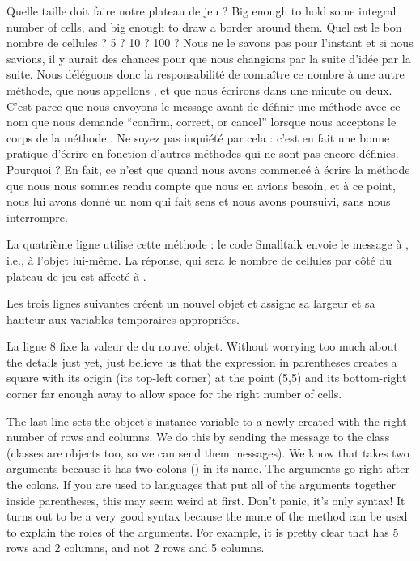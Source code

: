 \documentclass[a4paper,10pt,twoside]{book}
\begin{document}
Quelle taille doit faire notre plateau de jeu ? Big enough to hold some integral number of cells, and big enough to draw a border around them.
Quel est le bon nombre de cellules ? 5 ? 10 ? 100 ? Nous ne le savons pas pour l'instant et si nous savions, il y aurait des chances pour que nous changions par la suite d'idée par la suite. Nous déléguons donc la responsabilité de connaître ce nombre à une autre méthode, que nous appellons , et que nous écrirons dans une minute ou deux.
C'est parce que nous envoyons le message  avant de définir une méthode avec ce nom que \squeak nous demande ``confirm, correct, or cancel'' lorsque nous acceptons le corps de la méthode .
Ne soyez pas inquiété par cela : c'est en fait une bonne pratique d'écrire en fonction d'autres méthodes qui ne sont pas encore définies.
Pourquoi ? En fait, ce n'est que quand nous avons commencé à écrire la méthode  que nous nous sommes rendu compte que nous en avions besoin, et à ce point, nous lui avons donné un nom qui fait sens et nous avons poursuivi, sans nous interrompre.
 
La quatrième ligne utilise cette méthode : le code Smalltalk  envoie le message  à , i.e., à l'objet lui-même. La réponse, qui sera le nombre de cellules par côté du plateau de jeu est affecté à .

Les trois lignes suivantes créent un nouvel objet  et assigne sa largeur et sa hauteur aux variables temporaires appropriées.

La ligne 8 fixe la valeur de  du nouvel objet.
Without worrying too much about the details just yet, just believe us that the expression in parentheses creates a square with its origin (\ie its top-left corner) at the point (5,5) and its bottom-right corner far enough away to allow space for the right number of cells.

The last line sets the  object's instance variable  to a newly created  with the right number of rows and columns.   We do this by sending the message  to the  class (classes are objects too, so we can send them messages).  We know that  takes two arguments because it has two colons (\ct{:}) in its name.   The arguments go right after the colons.
If you are used to languages that put all of the arguments together inside parentheses, this may seem weird at first.  Don't panic, it's only syntax!
It turns out to be a very good syntax because the name of the method can be used to explain the roles of the arguments.  For example, it is pretty clear that  has 5 rows and 2 columns, and not 2 rows and 5 columns.
\end{document}

